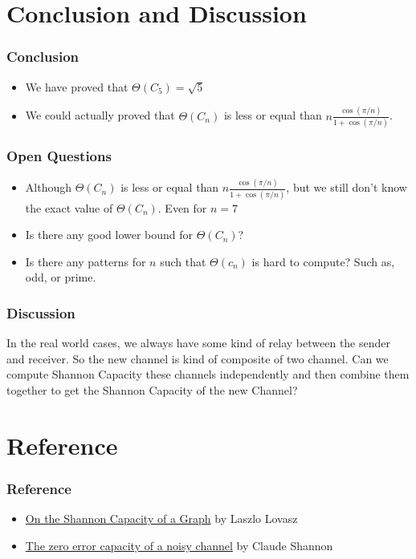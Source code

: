 \section{Conclusion and Discussion}

\begin{frame}
      \frametitle{Conclusion}
      \begin{itemize}
            \item We have proved that $\Theta(C_{5}) = \sqrt{5}$
            \item We could actually proved that $\Theta(C_{n})$ is less or equal than $ n\frac{\cos(\pi/n)}{1+\cos(\pi/n)} $.
      \end{itemize}
\end{frame}

\begin{frame}
      \frametitle{Open Questions}
      \begin{itemize}
            \item Although $\Theta(C_{n})$ is less or equal than $ n\frac{\cos(\pi/n)}{1+\cos(\pi/n)} $, but we still don't know the exact value of $\Theta(C_{n})$. Even for $n=7$
            \item Is there any good lower bound for $\Theta(C_{n})$?
            \item Is there any patterns for $n$ such that $\Theta(c_{n})$ is hard to compute? Such as, odd, or prime.
      \end{itemize}
\end{frame}

\begin{frame}
      \frametitle{Discussion}

      In the real world cases, we always have some kind of relay between the sender and receiver. So the new channel is kind of composite of two channel. Can we compute Shannon Capacity these channels independently and then combine them together to get the Shannon Capacity of the new Channel?
\end{frame}

\section{Reference}

\begin{frame}
      \frametitle{Reference}
      \begin{itemize}
            \item \href{https://ieeexplore.ieee.org/stamp/stamp.jsp?arnumber=1055985}{On the Shannon Capacity of a Graph} by Laszlo Lovasz
            \item \href{https://ieeexplore.ieee.org/stamp/stamp.jsp?tp=&arnumber=1056798}{The zero error capacity of a noisy channel} by Claude Shannon
      \end{itemize}
\end{frame}